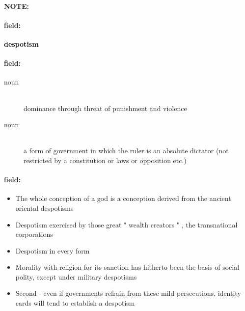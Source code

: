 \documentclass[12pt]{article}
\newenvironment{note}{\paragraph{NOTE:}}{}
\newenvironment{field}{\paragraph{field:}}{}
\begin{document}
\begin{note}
\begin{field}
\textbf{\large despotism}
\end{field}


\begin{field}
\begin{description}
\item[noun] \hfill \\ 
dominance through threat of punishment and violence

\item[noun] \hfill \\ 
a form of government in which the ruler is an absolute dictator (not restricted by a constitution or laws or opposition etc.)

\end{description}
\end{field}

\begin{field}
\begin{itemize}
\item The whole conception of a god is a conception derived from the ancient oriental despotisms
\item Despotism exercised by those great " wealth creators " , the transnational corporations
\item Despotism in every form
\item Morality with religion for its sanction has hitherto been the basis of social polity, except under military despotisms
\item Second - even if governments refrain from these mild persecutions, identity cards will tend to establish a despotism
\end{itemize}
\end{field}
\end{note}
\end{document}
